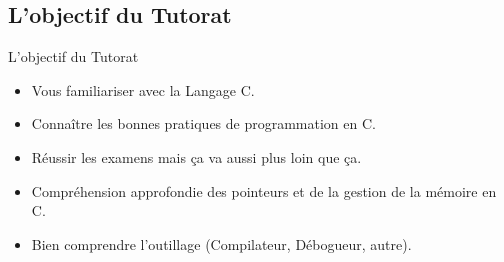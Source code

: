 \documentclass{beamer}
\begin{document}
\begin{darkframes}
  	\subsection{L'objectif du Tutorat}
  	
  	\begin{frame}{L'objectif du Tutorat}
  		\begin{itemize}
	  		\item Vous familiariser avec la Langage C.
	  		\item Connaître les bonnes pratiques de programmation en C.
	  		\item Réussir les examens mais ça va aussi plus loin que ça.
	  		\item Compréhension approfondie des pointeurs et de la gestion de la mémoire en C.
	  		\item Bien comprendre l'outillage (Compilateur, Débogueur, autre).
  		\end{itemize}
    \end{frame}


\end{darkframes}
\end{document}

